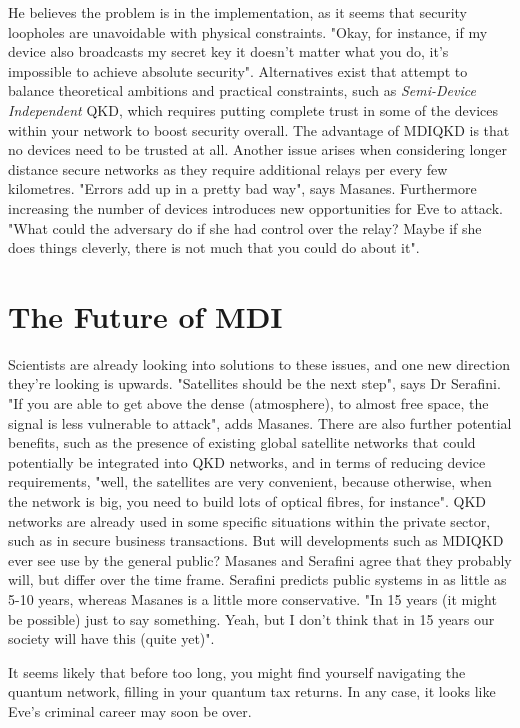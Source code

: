 \documentclass[journal]{vgtc}
\begin{document}
\noindent He believes the problem is in the implementation, as it seems that security loopholes are unavoidable with physical constraints. "Okay, for instance, if my device also broadcasts my secret key it doesn't matter what you do, it's impossible to achieve absolute security". Alternatives exist that attempt to balance theoretical ambitions and practical constraints, such as \textit{Semi-Device Independent} QKD, which requires putting complete trust in some of the devices within your network to boost security overall. The advantage of MDIQKD is that no devices need to be trusted at all. Another issue arises when considering longer distance secure networks as they require additional relays per every few kilometres. "Errors add up in a pretty bad way", says Masanes. Furthermore increasing the number of devices introduces new opportunities for Eve to attack. "What could the adversary do if she had control over the relay? Maybe if she does things cleverly, there is not much that you could do about it".


\section{The Future of MDI}

Scientists are already looking into solutions to these issues, and one new direction they're looking is upwards. "Satellites should be the next step", says Dr Serafini. "If you are able to get above the dense (atmosphere), to almost free space, the signal is less vulnerable to attack", adds Masanes. There are also further potential benefits, such as the presence of existing global satellite networks that could potentially be integrated into QKD networks, and in terms of reducing device requirements, "well, the satellites are very convenient, because otherwise, when the network is big, you need to build lots of optical fibres, for instance". QKD networks are already used in some specific situations within the private sector, such as in secure business transactions. But will developments such as MDIQKD ever see use by the general public? Masanes and Serafini agree that they probably will, but differ over the time frame. Serafini predicts public systems in as little as 5-10 years, whereas Masanes is a little more conservative. "In 15 years (it might be possible) just to say something. Yeah, but I don't think that in 15 years our society will have this (quite yet)".

\vspace{0.3cm}

\noindent It seems likely that before too long, you might find yourself navigating the quantum network, filling in your quantum tax returns. In any case, it looks like Eve's criminal career may soon be over.

\vspace{0.3cm}

  

\end{document}
